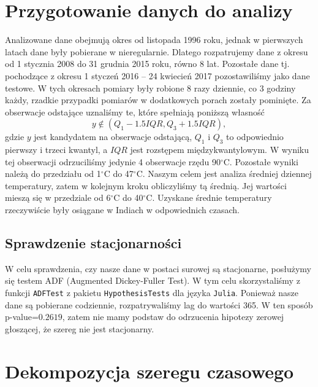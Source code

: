 \documentclass[12pt]{article}
\begin{document}
	\section{Przygotowanie danych do analizy}
	Analizowane dane obejmują okres od listopada 1996 roku, jednak w pierwszych latach dane były pobierane w nieregularnie. Dlatego rozpatrujemy dane z okresu od 1 stycznia 2008 do 31 grudnia 2015 roku, równo 8 lat. Pozostałe dane tj. pochodzące z okresu 1 styczeń 2016 -- 24 kwiecień 2017 pozostawiliśmy jako dane testowe. W tych okresach pomiary były robione 8 razy dziennie, co 3 godziny każdy, rzadkie przypadki pomiarów w dodatkowych porach zostały pominięte. Za obserwacje odstające uznaliśmy te, które spełniają poniższą własność
	\begin{equation}
		y\notin\left(Q_1-1.5IQR,Q_3+1.5IQR\right),
	\end{equation}
	gdzie $y$ jest kandydatem na obserwacje odstającą, $Q_1$ i $Q_3$ to odpowiednio pierwszy i trzeci kwantyl, a $IQR$ jest rozstępem międzykwantylowym. W wyniku tej obserwacji odrzuciliśmy jedynie 4 obserwacje rzędu 90$^\circ$C. Pozostałe wyniki należą do przedziału od 1$^\circ$C do 47$^\circ$C. Naszym celem jest analiza średniej dziennej temperatury, zatem w kolejnym kroku obliczyliśmy tą średnią. Jej wartości mieszą się w przedziale od 6$^\circ$C do 40$^\circ$C. Uzyskane średnie temperatury rzeczywiście były osiągane w Indiach w odpowiednich czasach.
	\subsection{Sprawdzenie stacjonarności}	
	W celu sprawdzenia, czy nasze dane w postaci surowej są stacjonarne, posłużymy się testem ADF (Augmented Dickey-Fuller Test). W tym celu skorzystaliśmy z funkcji \verb*|ADFTest| z pakietu \verb*|HypothesisTests| dla języka \verb*|Julia|. Ponieważ nasze dane są pobierane codziennie, rozpatrywaliśmy lag do wartości 365. W ten sposób p-value=$0.2619$, zatem nie mamy podstaw do odrzucenia hipotezy zerowej głoszącej, że szereg nie jest stacjonarny.
	
	
	
	\section{Dekompozycja szeregu czasowego}
\end{document}
